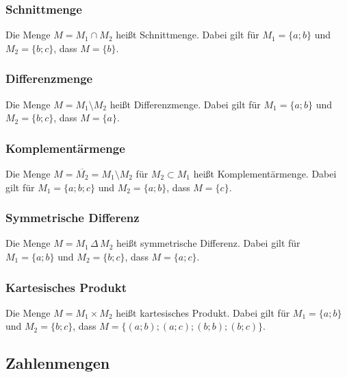 \subsubsection{Schnittmenge}
\begin{definition}
    Die Menge $M = M_1 \cap M_2$ heißt Schnittmenge. Dabei gilt für $M_1 = \{a;b\}$ und $M_2 = \{b;c\}$, dass $M = \{b\}$.
\end{definition}

\subsubsection{Differenzmenge}
\begin{definition}
    Die Menge $M = M_1 \setminus M_2$ heißt Differenzmenge. Dabei gilt für $M_1 = \{a;b\}$ und $M_2 = \{b;c\}$, dass $M = \{a\}$.
\end{definition}

\subsubsection{Komplementärmenge}
\begin{definition}
    Die Menge $M = \overline{M_2} = M_1 \setminus M_2$ für $M_2 \subset M_1$ heißt Komplementärmenge. Dabei gilt für $M_1 = \{a;b;c\}$ und $M_2 = \{a;b\}$, dass $M = \{c\}$.
\end{definition}

\subsubsection{Symmetrische Differenz}
\begin{definition}
    Die Menge $M = M_1 \, \Delta \, M_2$ heißt symmetrische Differenz. Dabei gilt für $M_1 = \{a;b\}$ und $M_2 = \{b;c\}$, dass $M = \{a;c\}$.
\end{definition}

\subsubsection{Kartesisches Produkt}
\begin{definition}
    Die Menge $M = M_1 \times M_2$ heißt kartesisches Produkt. Dabei gilt für $M_1 = \{a;b\}$ und $M_2 = \{b;c\}$, dass $M = \{(a;b);(a;c);(b;b);(b;c)\}$.
\end{definition}

\subsection{Zahlenmengen}
